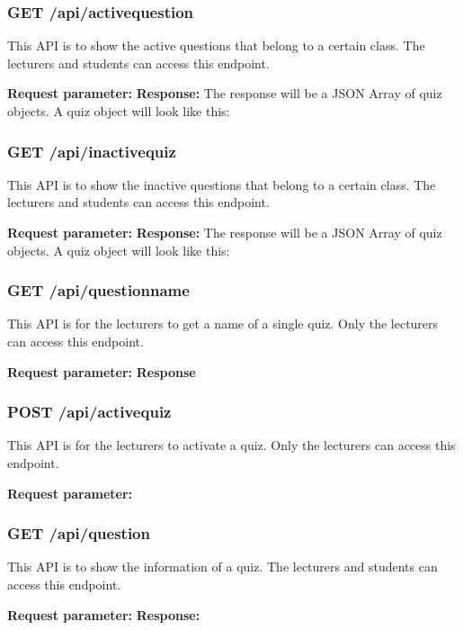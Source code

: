 \documentclass[a4paper, 11pt,openany]{book} %
\begin{document}
\subsubsection{GET /api/activequestion}
This API is to show the active questions that belong to a certain class. The lecturers and students can access this endpoint. \par
\textbf{Request parameter:}
\textbf{Response:}
The response will be a JSON Array of quiz objects. A quiz object will look like this:

\subsubsection{GET /api/inactivequiz}
This API is to show the inactive questions that belong to a certain class. The lecturers and students can access this endpoint. \par
\textbf{Request parameter:}
\textbf{Response:}
The response will be a JSON Array of quiz objects. A quiz object will look like this:

\subsubsection{GET /api/questionname}
This API is for the lecturers to get a name of a single quiz. Only the lecturers can access this endpoint. \par
\textbf{Request parameter:}
\textbf{Response}

\subsubsection{POST /api/activequiz}
This API is for the lecturers to activate a quiz. Only the lecturers can access this endpoint. \par
\textbf{Request parameter:}

\subsubsection{GET /api/question}
This API is to show the information of a quiz. The lecturers and students can access this endpoint. \par
\textbf{Request parameter:}
\textbf{Response:}
\end{document}

